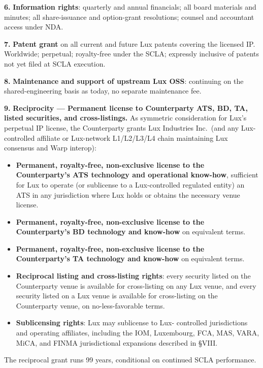\documentclass[11pt,letterpaper]{article}
\begin{document}
\textbf{6.} \textbf{Information rights}: quarterly and annual
financials; all board materials and minutes; all share-issuance and
option-grant resolutions; counsel and accountant access under NDA.

\textbf{7.} \textbf{Patent grant} on all current and future Lux
patents covering the licensed IP. Worldwide; perpetual; royalty-free
under the SCLA; expressly inclusive of patents not yet filed at SCLA
execution.

\textbf{8.} \textbf{Maintenance and support of upstream Lux OSS}:
continuing on the shared-engineering basis as today, no separate
maintenance fee.

\textbf{9.} \textbf{Reciprocity --- Permanent license to Counterparty
ATS, BD, TA, listed securities, and cross-listings.} As symmetric
consideration for Lux's perpetual IP license, the Counterparty grants
Lux Industries Inc.\ (and any Lux-controlled affiliate or Lux-network
L1/L2/L3/L4 chain maintaining Lux consensus and Warp interop):

\begin{itemize}[leftmargin=2em,itemsep=0.1em]
\item \textbf{Permanent, royalty-free, non-exclusive license to the
Counterparty's ATS technology and operational know-how}, sufficient
for Lux to operate (or sublicense to a Lux-controlled regulated
entity) an ATS in any jurisdiction where Lux holds or obtains the
necessary venue license.
\item \textbf{Permanent, royalty-free, non-exclusive license to the
Counterparty's BD technology and know-how} on equivalent terms.
\item \textbf{Permanent, royalty-free, non-exclusive license to the
Counterparty's TA technology and know-how} on equivalent terms.
\item \textbf{Reciprocal listing and cross-listing rights}: every
security listed on the Counterparty venue is available for
cross-listing on any Lux venue, and every security listed on a Lux
venue is available for cross-listing on the Counterparty venue, on
no-less-favorable terms.
\item \textbf{Sublicensing rights}: Lux may sublicense to Lux-
controlled jurisdictions and operating affiliates, including the
IOM, Luxembourg, FCA, MAS, VARA, MiCA, and FINMA jurisdictional
expansions described in \S VIII.
\end{itemize}

The reciprocal grant runs 99 years, conditional on continued SCLA
performance.
\end{document}
